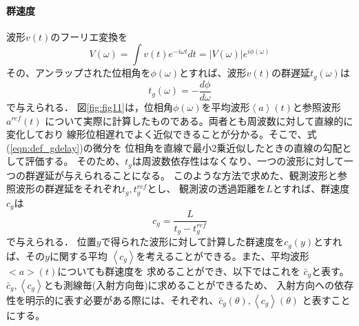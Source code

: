 \paragraph{群速度}
波形$v(t)$のフーリエ変換を
\begin{equation}
	V(\omega)=\int v(t)e^{-i\omega t} dt = \left| V(\omega) \right|e^{i\phi(\omega)}
	\label{eqn:phase}
\end{equation}
その、アンラップされた位相角を$\phi(\omega)$とすれば、波形$v(t)$の群遅延$t_g(\omega)$は
\begin{equation}
	t_g(\omega)=-\frac{d\phi}{d\omega}
	\label{eqn:def_gdelay}
\end{equation}
で与えられる．
図\ref{fig:fig11}は，位相角$\phi(\omega)$を平均波形$\left<a\right>(t)$と参照波形$a^{ref}(t)$
について実際に計算したものである。両者とも周波数に対して直線的に変化しており
線形位相遅れでよく近似できることが分かる。そこで、式(\ref{eqn:def_gdelay})の微分を
位相角を直線で最小2乗近似したときの直線の勾配として評価する。
そのため、$t_g$は周波数依存性はなくなり、一つの波形に対して一つの群遅延が与えられることになる。
このような方法で求めた、観測波形と参照波形の群遅延をそれぞれ$t_g, t_g^{ref}$とし、
観測波の透過距離を$L$とすれば、群速度$c_g$は
\begin{equation}
	c_g=\frac{L}{t_g-t_g^{ref}}
	\label{eqn:def_cg}
\end{equation}
で与えられる．
位置$y$で得られた波形に対して計算した群速度を$c_g(y)$とすれば、その$y$に関する平均
$\left< c_g \right>$を考えることができる。また、平均波形$<a>(t)$についても群速度を
求めることができ、以下ではこれを $\bar c_g$と表す。
$\bar c_g, \left< c_g \right>$とも測線毎(入射方向毎)に求めることができるため、
入射方向への依存性を明示的に表す必要がある際には、それぞれ、$\bar c_g(\theta), \left< c_g\right>(\theta)$
と表すことにする。
